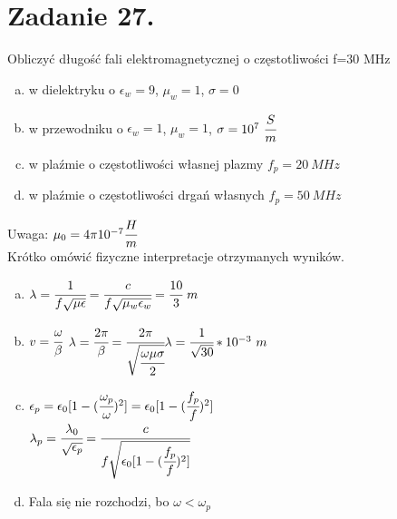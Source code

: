 \section*{Zadanie 27.}
\begin{task}
Obliczyć długość fali elektromagnetycznej o częstotliwości f=30 MHz
\begin{enumerate}[a)]
\item w dielektryku o $\epsilon_{w}=9$, $\mu_{w}=1$, $\sigma=0$
\item w przewodniku o $\epsilon_{w}=1$, $\mu_{w}=1$, $\sigma=10^{7} \ \cfrac{S}{m}$
\item w plaźmie o częstotliwości własnej plazmy $f_{p}=20\ MHz$
\item w plaźmie o częstotliwości drgań własnych $f_{p}=50\ MHz$
\end{enumerate}
Uwaga: $\mu_{0}=4\pi10^{-7} \cfrac{H}{m}$\\
Krótko omówić fizyczne interpretacje otrzymanych wyników.\\
\end{task}

\begin{solution}
\begin{enumerate}[a)]
\item $\lambda=\cfrac{1}{f\sqrt{\mu\epsilon}}=\cfrac{c}{f\sqrt{\mu_{w}\epsilon_{w}}}=\cfrac{10}{3} \ m$
\item $v=\cfrac{\omega}{\beta}$ $\lambda=
            \cfrac{2\pi}{\beta}=\cfrac{2\pi}{\sqrt{\cfrac{\omega\mu\sigma}{2}}}\\ \lambda=\cfrac{1}{\sqrt{30}}*10^{-3}\ m$
\item $\epsilon_{p}=\epsilon_{0}[1-(\cfrac{\omega_p}{\omega})^{2}]=\epsilon_{0}[1-(\cfrac{f_{p}}{f})^{2}]$\\
                $\lambda_{p}=\cfrac{\lambda_{0}}{\sqrt{\epsilon_{p}}}=\cfrac{c}{f\sqrt{\epsilon_{0}[1-(\cfrac{f_{p}}{f})^{2}]}}$
\item Fala się nie rozchodzi, bo $\omega<\omega_{p}$

\end{enumerate}
\end{solution}



